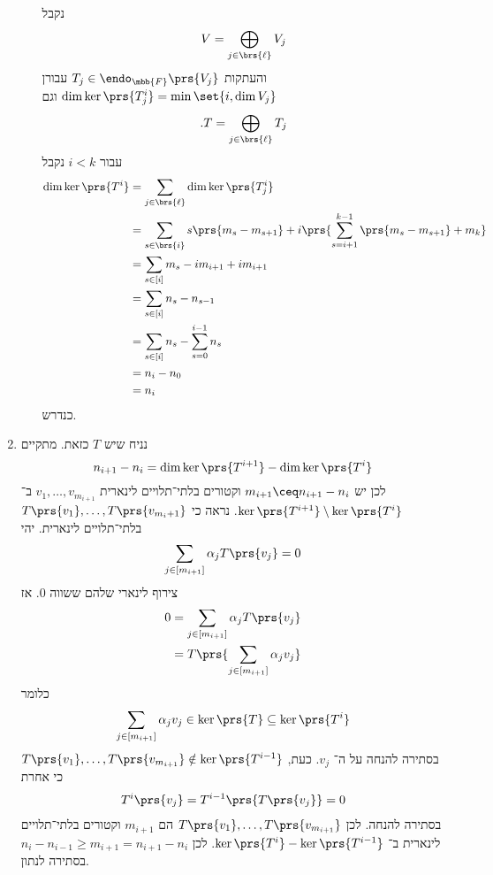 \documentclass[a4paper,10pt,oneside,openany]{article}
\begin{document}
\begin{solution}
\begin{enumerate}
\begin{itemize}
נקבל
\[V = \bigoplus_{j \in \brs{\ell}} V_j\]
והעתקות
$T_j \in \endo_{\mbb{F}}\prs{V_j}$
עבורן
$\dim \ker\prs{T_j^i} = \min\set{i, \dim V_j}$
וגם
\[\text{.} T = \bigoplus_{j \in \brs{\ell}} T_j\]
עבור
$i < k$
נקבל
\begin{align*}
\dim \ker\prs{T^i} &= \sum_{j \in \brs{\ell}} \dim \ker\prs{T_j^i}
\\&= \sum_{s \in \brs{i}} s\prs{m_s - m_{s+1}} + i\prs{\sum_{s = i+1}^{k-1} \prs{m_s - m_{s+1}} + m_k}
\\&= \sum_{s \in [i]} m_s - i m_{i+1} + i m_{i+1}
\\&= \sum_{s \in [i]} n_s - n_{s-1}
\\&= \sum_{s \in [i]} n_s - \sum_{s = 0}^{i-1} n_s
\\&= n_i - n_0
\\&= n_i
\end{align*}
כנדרש.
\end{itemize}
\item נניח שיש
$T$
כזאת.
מתקיים
\[n_{i+1} - n_i = \dim \ker\prs{T^{i+1}} - \dim \ker\prs{T^{i}}\]
לכן יש
$m_{i+1} \ceq n_{i+1} - n_i$
וקטורים בלתי־תלויים לינארית
$v_1, \ldots, v_{m_{i+1}}$
ב־%
$\ker\prs{T^{i+1}} \setminus \ker\prs{T^i}$.
נראה כי
$T\prs{v_1}, \ldots, T\prs{v_{m_i+1}}$
בלתי־תלויים לינארית.
יהי
\[\sum_{j \in [m_{i+1}]} \alpha_j T\prs{v_j} = 0\]
צירוף לינארי שלהם ששווה
$0$.
אז
\begin{align*}
0 &= \sum_{j \in [m_{i+1}]} \alpha_j T\prs{v_j}
\\&= T\prs{\sum_{j \in [m_{i+1}]} \alpha_j v_j}
\end{align*}
כלומר
\[\sum_{j \in [m_{i+1}]} \alpha_j v_j \in \ker \prs{T} \subseteq \ker\prs{T^i}\]
בסתירה להנחה על ה־%
$v_j$.
כעת,
$T\prs{v_1}, \ldots, T\prs{v_{m_{i + 1}}} \notin \ker\prs{T^{i-1}}$
כי אחרת
\begin{align*}
T^{i}\prs{v_j} = T^{i-1}\prs{T\prs{v_j}} = 0
\end{align*}
בסתירה להנחה.
לכן
$T\prs{v_1}, \ldots, T\prs{v_{m_{i+1}}}$
הם
$m_{i+1}$
וקטורים בלתי־תלויים לינארית ב־%
$\ker\prs{T^i} - \ker\prs{T^{i-1}}$.
לכן
$n_i - n_{i-1} \geq m_{i+1} = n_{i+1} - n_i$
בסתירה לנתון.
\end{enumerate}
\end{solution}
\end{document}
